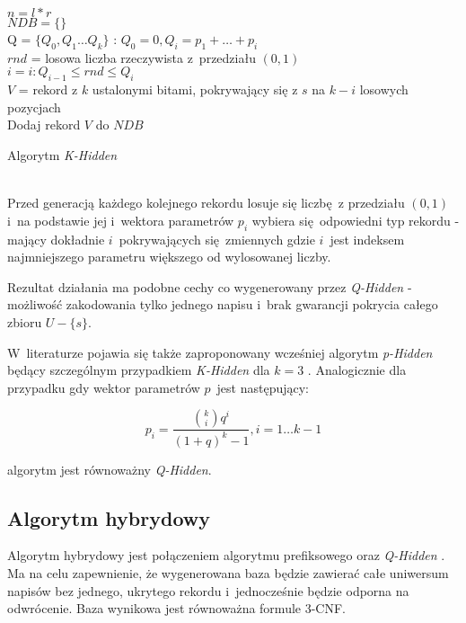  \begin{algorithm}[H]
    \SetAlgoLined
    
    $n = l * r$\\
    $NDB = \{\}$\\
    Q = $\{Q_0, Q_1 \dots Q_k \}$ : $Q_0 = 0, Q_i = p_1 + \dots + p_i $\\
    {
        $rnd$ = losowa liczba rzeczywista z~przedziału $(0,1)$\\
        $i = i : Q_{i-1} \le rnd \le Q_i$\\
        $V$ = rekord z $k$ ustalonymi bitami, pokrywający się z $s$ na $k-i$ losowych pozycjach\\
        Dodaj rekord $V$ do $NDB$
    } 
    
    \caption{Algorytm \textit{K-Hidden}}
    \label{alg:khidden}
\end{algorithm}
~\\
Przed generacją każdego kolejnego rekordu losuje się liczbę z przedziału $(0,1)$ i~na podstawie jej i~wektora parametrów $p_i$ wybiera
się odpowiedni typ rekordu - mający dokładnie $i$~pokrywających się zmiennych gdzie $i$~jest indeksem najmniejszego parametru większego
od wylosowanej liczby.

Rezultat działania ma podobne cechy co wygenerowany przez \textit{Q-Hidden} - możliwość zakodowania tylko
jednego napisu i~brak gwarancji pokrycia całego zbioru $U - \{s\}$.

W~literaturze pojawia się także zaproponowany wcześniej algorytm \textit{p-Hidden} będący szczególnym przypadkiem \textit{K-Hidden} dla $k=3$ \cite{p-hidden}.
Analogicznie dla przypadku gdy wektor parametrów $p$~jest następujący:

\[ p_i = \frac{{{k}\choose{i}}q^i}{(1+ q)^k - 1}, i = 1 \dots k-1   \]

algorytm jest równoważny \textit{Q-Hidden}. \cite{k-hidden}

\subsection{Algorytm hybrydowy}
Algorytm hybrydowy jest połączeniem algorytmu prefiksowego oraz \textit{Q-Hidden} \cite{hybrid}. 
Ma na celu zapewnienie, że wygenerowana baza będzie zawierać całe uniwersum napisów bez jednego, ukrytego rekordu i~jednocześnie
będzie odporna na odwrócenie.  Baza wynikowa jest równoważna formule 3-CNF.

